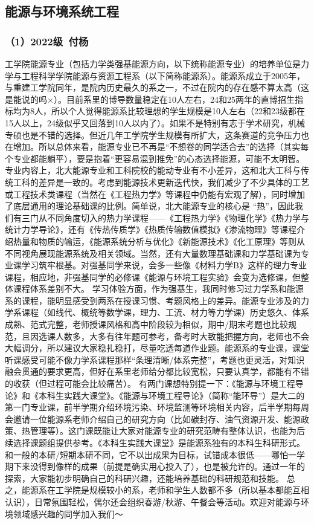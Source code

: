 \documentclass[11pt,oneside]{book}
\begin{document}
\subsection{能源与环境系统工程}
\subsubsection{（1）2022级\ 付杨}
工学院能源专业（包括力学类强基能源方向，以下统称能源专业）的培养单位是力学与工程科学学院能源与资源工程系（以下简称能源系）。能源系成立于2005年，与重建工学院同年，是院内历史最久的系之一，不过在院内的存在感不算太高（这是能说的吗×）。目前系里的博导数量稳定在10人左右，24和25两年的直博招生指标均为8人，所以个人觉得能源系比较理想的学生规模是10人左右（22和23级都在15人以上，24级似乎又回落到10人以内了）。如果不是特别有志于学术研究，机械专硕也是不错的选择。但近几年工学院学生规模有所扩大，这条赛道的竞争压力也在增加。所以总体来看，能源专业已不再是“不想卷的同学适合去”的选择（其实每个专业都能躺平），要是抱着“更容易混到推免”的心态选择能源，可能不太明智。
专业内容上，北大能源专业和工科院校的能动专业有不小差异，这和北大工科与传统工科的差异是一致的。考虑到能源技术更新迭代快，我们减少了不少具体的工艺或工程技术类课程（当然在《工程热力学》等课程中仍能有宏观了解），同时增加了底层通用的理论基础课的比例。简单说，北大能源专业的核心是 “热”，因此我们有三门从不同角度切入的热力学课程——《工程热力学》《物理化学》《热力学与统计力学导论》，还有《传热传质学》《热质传输数值模拟》《渗流物理》等课程介绍热量和物质的输运，《能源系统分析与优化》《新能源技术》《化工原理》等则从不同视角展现能源系统及相关领域。当然，还有大量数理基础课和力学基础课为专业课学习筑牢根基。对强基同学来说，会多一些像《材料力学B》这样的理力专业课程，相应地，非强基同学的必修课《能源与环境工程实验》会变为选修课，但整体课程体系差别不大。
学习体验方面，作为强基生，我同时修习过力学系和能源系的课程，能明显感受到两系在授课习惯、考题风格上的差异。能源专业涉及的力学系课程（如线代、概统等数学课，理力、工流、材力等力学课）历史悠久、体系成熟、范式完整，老师授课风格和高中阶段较为相似，期中/期末考题也比较规范，且因选课人数多，大多有往年题可参考，备考时大致能把握方向，老师也不会大幅调分，所以建议大家稳扎稳打，尽量吃透每道作业题。能源系的专业课，课堂听课感受可能不像力学系课程那样“条理清晰/体系完整”，考题也更灵活，对知识融会贯通的要求更高，但好在系里老师给分都比较宽松，只要认真学，都能有不错的收获（但过程可能会比较痛苦）。
有两门课想特别提一下：《能源与环境工程导论》和《本科生实践大课堂》。《能源与环境工程导论》（简称“能环导”）是大二的第一门专业课，前半学期介绍环境污染、环境监测等环境相关内容，后半学期每周会邀请一位能源系老师介绍自己的研究方向（比如碳封存、油气资源开发、能源政策、热管理等）。这门课既能让大家对能源专业的研究范畴有整体认识，也能为后续选择课题组提供参考。《本科生实践大课堂》是能源系独有的本科生科研形式。和一般的本研/短期本研不同，它不以出成果为目标，试错成本很低——哪怕一学期下来没得到像样的成果（前提是确实用心投入了），也是被允许的。通过一年的探索，大家能初步明确自己的科研兴趣，还能培养基础的科研规范和技能。
总之，能源系在工学院是规模较小的系，老师和学生人数都不多（所以基本都能互相认识），日常氛围轻松，偶尔还会组织春游/秋游、午餐会等活动。欢迎对能源与环境领域感兴趣的同学加入我们～
\end{document}
